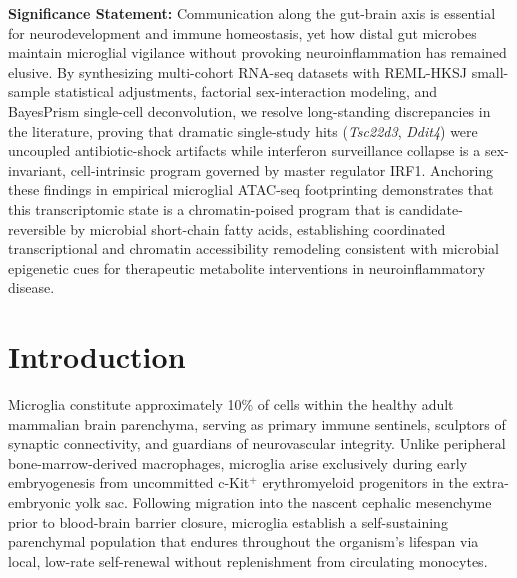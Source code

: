 \documentclass[10pt,a4paper]{article}
\begin{document}
\vspace{0.8em}
\noindent\textbf{Significance Statement:}\newline
Communication along the gut-brain axis is essential for neurodevelopment and immune homeostasis, yet how distal gut microbes maintain microglial vigilance without provoking neuroinflammation has remained elusive. By synthesizing multi-cohort RNA-seq datasets with REML-HKSJ small-sample statistical adjustments, factorial sex-interaction modeling, and BayesPrism single-cell deconvolution, we resolve long-standing discrepancies in the literature, proving that dramatic single-study hits (\textit{Tsc22d3}, \textit{Ddit4}) were uncoupled antibiotic-shock artifacts while interferon surveillance collapse is a sex-invariant, cell-intrinsic program governed by master regulator IRF1. Anchoring these findings in empirical microglial ATAC-seq footprinting demonstrates that this transcriptomic state is a chromatin-poised program that is candidate-reversible by microbial short-chain fatty acids, establishing coordinated transcriptional and chromatin accessibility remodeling consistent with microbial epigenetic cues for therapeutic metabolite interventions in neuroinflammatory disease.



\vspace{1.5em}
\section{Introduction}
Microglia constitute approximately 10\% of cells within the healthy adult mammalian brain parenchyma, serving as primary immune sentinels, sculptors of synaptic connectivity, and guardians of neurovascular integrity\cite{colonna2017_1,prinz2019_2}. Unlike peripheral bone-marrow-derived macrophages, microglia arise exclusively during early embryogenesis from uncommitted c-Kit$^{+}$ erythromyeloid progenitors in the extra-embryonic yolk sac\cite{ginhoux2010_3}. Following migration into the nascent cephalic mesenchyme prior to blood-brain barrier closure, microglia establish a self-sustaining parenchymal population that endures throughout the organism's lifespan via local, low-rate self-renewal without replenishment from circulating monocytes\cite{hashimoto2013_4,askew2017_5}.
\end{document}
